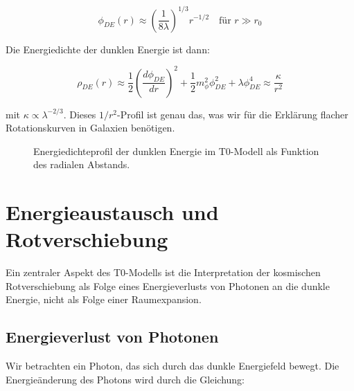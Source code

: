 \documentclass[a4paper,12pt]{article}
\theoremstyle{definition}
\theoremstyle{remark}
\begin{document}
	\begin{equation}
		\phi_{DE}(r) \approx \left(\frac{1}{8\lambda}\right)^{1/3} r^{-1/2} \quad \text{für } r \gg r_0
	\end{equation}
	
	Die Energiedichte der dunklen Energie ist dann:
	
	\begin{equation}
		\rho_{DE}(r) \approx \frac{1}{2}\left(\frac{d\phi_{DE}}{dr}\right)^2 + \frac{1}{2}m_{\phi}^2\phi_{DE}^2 + \lambda\phi_{DE}^4 \approx \frac{\kappa}{r^2}
	\end{equation}
	
	mit $\kappa \propto \lambda^{-2/3}$. Dieses $1/r^2$-Profil ist genau das, was wir für die Erklärung flacher Rotationskurven in Galaxien benötigen.
	
	\begin{figure}[h]
		\centering
		\caption{Energiedichteprofil der dunklen Energie im T0-Modell als Funktion des radialen Abstands.}
	\end{figure}
	
	\section{Energieaustausch und Rotverschiebung}
	Ein zentraler Aspekt des T0-Modells ist die Interpretation der kosmischen Rotverschiebung als Folge eines Energieverlusts von Photonen an die dunkle Energie, nicht als Folge einer Raumexpansion.
	
	\subsection{Energieverlust von Photonen}
	Wir betrachten ein Photon, das sich durch das dunkle Energiefeld bewegt. Die Energieänderung des Photons wird durch die Gleichung:
	
\end{document}
